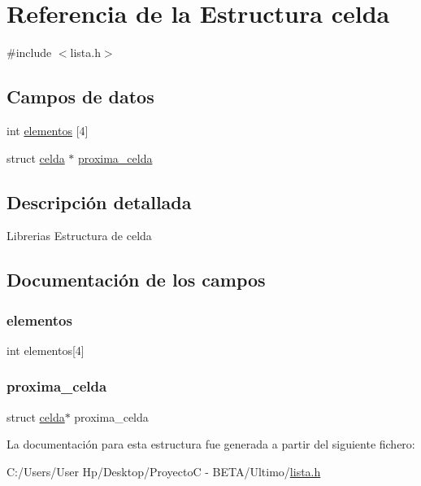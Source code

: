 \hypertarget{structcelda}{}\section{Referencia de la Estructura celda}
\label{structcelda}


{\ttfamily \#include $<$lista.\+h$>$}

\subsection*{Campos de datos}
\begin{DoxyCompactItemize}
\item 
int \hyperlink{structcelda_aad04a62f03957ab29529c5a17e5e67f1}{elementos} \mbox{[}4\mbox{]}
\item 
struct \hyperlink{structcelda}{celda} $\ast$ \hyperlink{structcelda_ab8c62672795c4f5be409f34a201b9ad2}{proxima\+\_\+celda}
\end{DoxyCompactItemize}


\subsection{Descripción detallada}
Librerias Estructura de celda 

\subsection{Documentación de los campos}
\hypertarget{structcelda_aad04a62f03957ab29529c5a17e5e67f1}{}\label{structcelda_aad04a62f03957ab29529c5a17e5e67f1} 
\subsubsection{\texorpdfstring{elementos}{elementos}}
{\footnotesize\ttfamily int elementos\mbox{[}4\mbox{]}}

\hypertarget{structcelda_ab8c62672795c4f5be409f34a201b9ad2}{}\label{structcelda_ab8c62672795c4f5be409f34a201b9ad2} 
\subsubsection{\texorpdfstring{proxima\+\_\+celda}{proxima\_celda}}
{\footnotesize\ttfamily struct \hyperlink{structcelda}{celda}$\ast$ proxima\+\_\+celda}



La documentación para esta estructura fue generada a partir del siguiente fichero\+:\begin{DoxyCompactItemize}
\item 
C\+:/\+Users/\+User Hp/\+Desktop/\+Proyecto\+C -\/ B\+E\+T\+A/\+Ultimo/\hyperlink{lista_8h}{lista.\+h}\end{DoxyCompactItemize}
